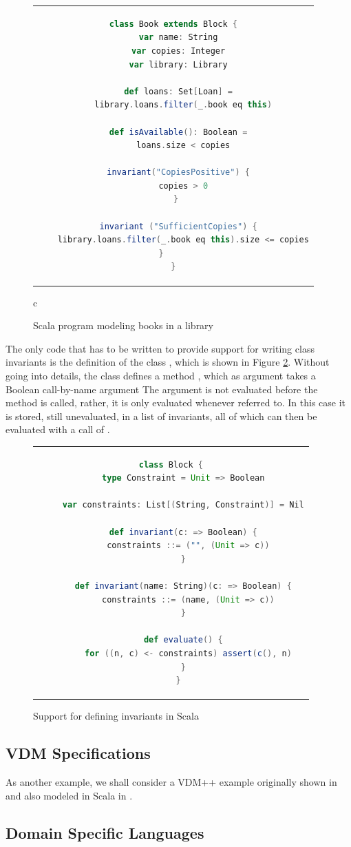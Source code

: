 \begin{figure}
\begin{center}
\begin{tabular}{c}
\begin{lstlisting}[language=scala]
class Book extends Block {
  var name: String
  var copies: Integer
  var library: Library

  def loans: Set[Loan] =
    library.loans.filter(_.book eq this)

  def isAvailable(): Boolean =
    loans.size < copies
      
  invariant("CopiesPositive") {
    copies > 0
  } 
       
  invariant ("SufficientCopies") {
    library.loans.filter(_.book eq this).size <= copies
  }       
}
\end{lstlisting}
\end{tabular}{c}
\end{center}
\caption{Scala program modeling books in a library}
\label{fig:book-scala}
\end{figure}

The only code that has to be written to provide support for writing
class invariants is the definition of the class , which is shown in Figure \ref{fig:invariant-scala}. Without going into details, the class defines a method ,
which as argument takes a Boolean call-by-name argument 
The argument is not evaluated before the method is called, 
rather, it is only evaluated whenever referred to. In this case
it is stored, still unevaluated, in a list of invariants, all
of which can then be evaluated with a call of .

\begin{figure}
\begin{center}
\begin{tabular}{c}
\begin{lstlisting}[language=scala]
   class Block {
     type Constraint = Unit => Boolean

     var constraints: List[(String, Constraint)] = Nil

     def invariant(c: => Boolean) {
       constraints ::= ("", (Unit => c))
     }

     def invariant(name: String)(c: => Boolean) {
       constraints ::= (name, (Unit => c))
     }

     def evaluate() {
       for ((n, c) <- constraints) assert(c(), n)
     }
   }
\end{lstlisting}
\end{tabular}
\end{center}
\label{fig:invariant-scala}
\caption{Support for defining invariants in Scala}
\end{figure}

\subsection{VDM Specifications}
\label{sec:vdm-in-scala}

As another example, we shall consider a VDM++ example originally shown in \cite{?} and also modeled in Scala in \cite{?}.

\subsection{Domain Specific Languages}
\label{sec:dsl-in-scala}


